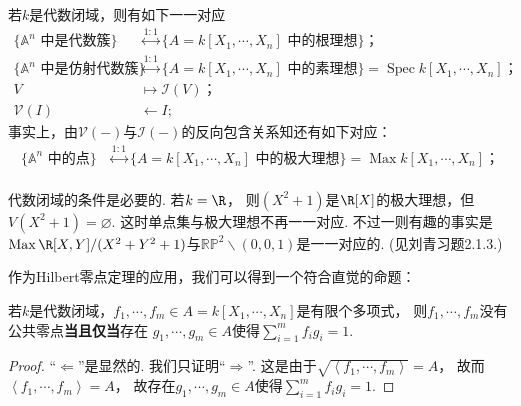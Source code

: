     \begin{theorem}
        若$k$是代数闭域，则有如下一一对应
        \begin{equation*}\begin{aligned}
            \{\mathbb{A}^{n}\text{ 中是代数簇}\} 
            &\overset{1:1}{\longleftrightarrow} \{A=k[X_{1},\cdots,X_{n}]\text{ 中的根理想}\}； \\
            \{\mathbb{A}^{n}\text{ 中是仿射代数簇}\}
            &\overset{1:1}{\longleftrightarrow} \{A=k[X_{1},\cdots,X_{n}]\text{ 中的素理想}\} 
            = \operatorname{Spec}k[X_{1},\cdots,X_{n}]； \\
            V &\longmapsto \mathcal{I}(V)；\\
            \mathcal{V}(I) &\longleftarrow I;
        \end{aligned}\end{equation*}
        事实上，由$\mathcal{V}(-)$与$\mathcal{I}(-)$的反向包含关系知还有如下对应：
        \begin{equation*}\begin{aligned}
            \{\mathbb{A}^{n}\text{ 中的点}\} 
            &\overset{1:1}{\longleftrightarrow} \{A=k[X_{1},\cdots,X_{n}]\text{ 中的极大理想}\} 
            = \operatorname{Max}k[X_{1},\cdots,X_{n}]； \\
        \end{aligned}\end{equation*}
    \end{theorem}

    \begin{remark}
        代数闭域的条件是必要的. 若$k=\R$，
        则$(X^{2}+1)$是$\R[X]$的极大理想，但$V(X^{2}+1)=\varnothing$. 这时单点集与极大理想不再一一对应.
        不过一则有趣的事实是$\operatorname{Max}\R[X,Y]/(X^{2}+Y^{2}+1)$与$\mathbb{R}\mathbb{P}^{2}\backslash(0,0,1)$是一一对应的.
        (见刘青习题2.1.3.)
    \end{remark}

    作为Hilbert零点定理的应用，我们可以得到一个符合直觉的命题：

    \begin{corollary}[弱形式Hilbert零点定理]
        若$k$是代数闭域，$f_{1},\cdots,f_{m} \in A=k[X_{1},\cdots,X_{n}]$是有限个多项式，
        则$f_{1},\cdots,f_{m}$没有公共零点\textbf{当且仅当}存在
        $g_{1},\cdots,g_{m} \in A$使得$\sum_{i=1}^{m}f_{i}g_{i}=1$.
    \end{corollary}
    \begin{proof}
        “$\Leftarrow$”是显然的. 我们只证明“$\Rightarrow$”. 
        这是由于$\sqrt{\left<f_{1},\cdots,f_{m}\right>}=A$，
        故而$\left<f_{1},\cdots,f_{m}\right>=A$，
        故存在$g_{1},\cdots,g_{m} \in A$使得$\sum_{i=1}^{m}f_{i}g_{i}=1$.
    \end{proof}

